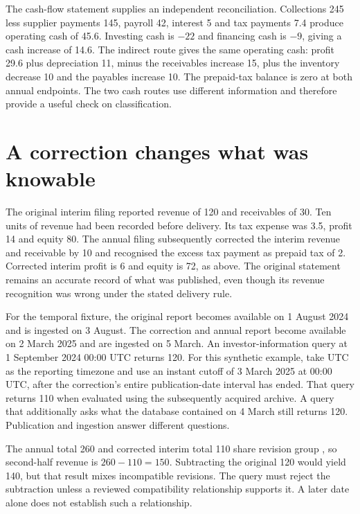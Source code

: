 The cash-flow statement supplies an independent reconciliation. Collections
245 less supplier payments 145, payroll 42, interest 5 and tax payments 7.4
produce operating cash of 45.6. Investing cash is $-22$ and financing cash
is $-9$, giving a cash increase of 14.6. The indirect route gives the same
operating cash: profit 29.6 plus depreciation 11, minus the receivables
increase 15, plus the inventory decrease 10 and the payables increase 10.
The prepaid-tax balance is zero at both annual endpoints. The two cash routes
use different information and therefore provide a useful check on classification.

\section{A correction changes what was knowable}

The original interim filing reported revenue of 120 and receivables of 30.
Ten units of revenue had been recorded before delivery. Its tax expense was
3.5, profit 14 and equity 80. The annual filing subsequently corrected the
interim revenue and receivable by 10 and recognised the excess tax payment as
prepaid tax of 2. Corrected interim profit is 6 and equity is 72, as above.
The original statement remains an accurate record of what was published, even
though its revenue recognition was wrong under the stated delivery rule.

For the temporal fixture, the original report becomes available on 1 August
2024 and is ingested on 3 August. The correction and annual report become
available on 2 March 2025 and are ingested on 5 March. An investor-information
query at 1 September 2024 00:00 UTC returns 120. For this synthetic example,
take UTC as the reporting timezone and use an instant cutoff of
3 March 2025 at 00:00 UTC, after the correction's entire publication-date
interval has ended. That query returns 110 when evaluated using the subsequently acquired archive. A query
that additionally asks what the database contained on 4 March still returns
120. Publication and ingestion answer different questions.

The annual total 260 and corrected interim total 110 share revision group
, so second-half revenue is $260-110=150$. Subtracting the original
120 would yield 140, but that result mixes incompatible revisions. The query
must reject the subtraction unless a reviewed compatibility relationship
supports it. A later date alone does not establish such a relationship.

